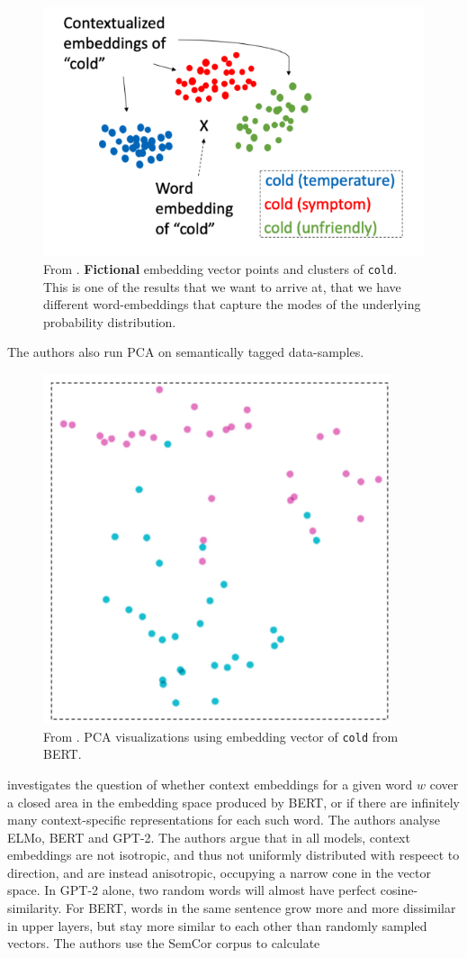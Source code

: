 \documentclass[a4paper,12pt,twoside,openright]{report}
\begin{document}
\begin{figure}[H]
	\center
  \includegraphics[width=0.4\linewidth]{./assets/relatedwork/cold_fictional_desired.png}
  \caption{From \cite{si19}. \textbf{Fictional} embedding vector points and clusters of \texttt{cold}. This is one of the results that we want to arrive at, that we have different word-embeddings that capture the modes of the underlying probability distribution. }
  \label{fig:cold_fictional_desired}
\end{figure}

The authors also run PCA on semantically tagged data-samples.

\begin{figure}[H]
	\center
  \includegraphics[width=0.4\linewidth]{./assets/relatedwork/cold_biobert.png}
  \caption{From \cite{si19}. PCA visualizations using embedding vector of \texttt{cold} from BERT.}
  \label{fig:cold_fictional_desired}
\end{figure}


\cite{ethayarajh19} investigates the question of whether context embeddings for a given word $w$ cover a closed area in the embedding space produced by BERT, or if there are infinitely many context-specific representations for each such word.
The authors analyse ELMo, BERT and GPT-2.
The authors argue that in all models, context embeddings are not isotropic, and thus not uniformly distributed with respeect to direction, and are instead anisotropic, occupying a narrow cone in the vector space.
In GPT-2 alone, two random words will almost have perfect cosine-similarity.
For BERT, words in the same sentence grow more and more dissimilar in upper layers, but stay more similar to each other than randomly sampled vectors.
The authors use the SemCor corpus to calculate \\
\end{document}
